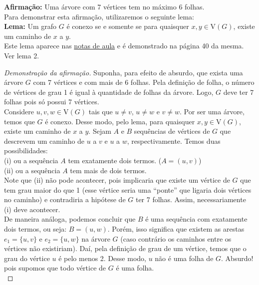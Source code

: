\documentclass[12pt, a4paper]{article}
\theoremstyle{definition} \newtheorem{prob}{Problema}
\theoremstyle{plain} \newtheorem*{teo}{Teorema}
\begin{document}
\textbf{Afirmação:} Uma árvore com 7 vértices tem no máximo 6 folhas. \\


Para demonstrar esta afirmação, utilizaremos o seguinte lema: \\

\textbf{Lema:} Um grafo \(G\) é conexo se e somente se para quaisquer \(x,y \in \mathrm{V}(G)\), existe um caminho de \(x\) a \(y\). \\

Este lema aparece nas \href{https://drive.google.com/file/d/16Gy9vck48p64A-3u1t2-uUVGOVqOlAOg/view}{notas de aula} e é demonstrado na página 40 da mesma. Ver lema 2.

\begin{proof}[Demonstração da afirmação]
Suponha, para efeito de absurdo, que exista uma árvore \(G\) com 7 vértices e com mais de 6 folhas. Pela definição de folha, o número de vértices de grau 1 é igual à quantidade de folhas da árvore. Logo, \(G\) deve ter 7 folhas pois só possui 7 vértices. \\

Considere \(u,v,w \in \mathrm{V}(G)\) tais que \(u\neq v\), \(u \neq w\) e \(v \neq w\). Por ser uma árvore, temos que \(G\) é conexo. Desse modo, pelo lema, para quaisquer \(x,y \in \mathrm{V}(G)\), existe um caminho de \(x\) a \(y\).  Sejam \(A\) e \(B\) sequências de vértices de \(G\) que descrevem um caminho de \(u\) a \(v\) e \(u\) a \(w\), respectivamente. Temos duas possibilidades: \\

(i) ou a sequência \(A\) tem exatamente dois termos. (\(A = (u,v)\)) \\

(ii) ou a sequência \(A\) tem mais de dois termos.  \\

Note que (ii) não pode acontecer, pois implicaria que existe um vértice de \(G\) que tem grau maior do que 1 (esse vértice seria uma ``ponte'' que ligaria dois vértices no caminho) e contradiria a hipótese de \(G\) ter 7 folhas. Assim, necessariamente (i) deve acontecer. \\

De maneira análoga, podemos concluir que \(B\) é uma sequência com exatamente dois termos, ou seja: \(B =(u,w)\). Porém, isso significa que existem as arestas \(e_1 = \{u,v\}\) e \(e_2 =\{u,w\}\) na árvore \(G\) (caso contrário os caminhos entre os vértices não existiriam). Daí, pela definição de grau de um vértice, temos que o grau do vértice \(u\) é pelo menos 2. Desse modo, \(u\) não é uma folha de \(G\). Absurdo! pois supomos que todo vértice de \(G\) é uma folha.\\


\end{proof}
\end{document}
